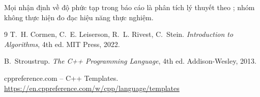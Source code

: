 \documentclass[12pt, a4paper]{article}
\begin{document}
Mọi nhận định về độ phức tạp trong báo cáo là phân tích lý thuyết theo \cite{clrs}; nhóm không
thực hiện đo đạc hiệu năng thực nghiệm.

\begin{thebibliography}{9}
  T.~H. Cormen, C.~E. Leiserson, R.~L. Rivest, C.~Stein.
  \textit{Introduction to Algorithms}, 4th ed.
  MIT Press, 2022.

  B.~Stroustrup.
  \textit{The C++ Programming Language}, 4th ed.
  Addison-Wesley, 2013.

  cppreference.com -- C++ Templates.
  \url{https://en.cppreference.com/w/cpp/language/templates}
\end{thebibliography}
\end{document}
